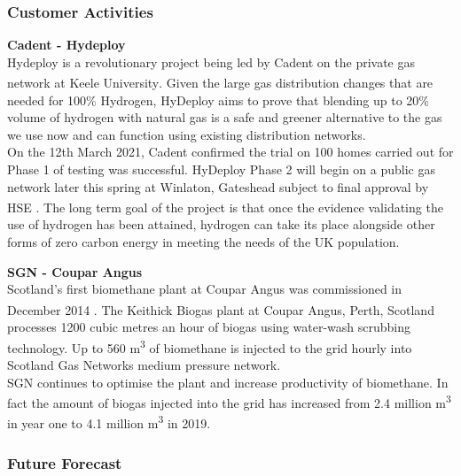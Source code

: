 \documentclass[11pt]{article}		%
\newcommand{\supercite}[1]{\textsuperscript{\cite{#1}}}		%
\begin{document}
    		\subsubsection{Customer Activities}%
    		
    		\textbf{Cadent - Hydeploy}
    		\\
            Hydeploy is a revolutionary project being led by Cadent on the private gas network at Keele University\supercite{whatishydeploy}. Given the large gas distribution changes that are needed for 100\% Hydrogen, HyDeploy aims to prove that blending up to 20\% volume of hydrogen with natural gas is a safe and greener alternative to the gas we use now and can function using existing distribution networks.
            \\
            \hspace*{3ex}On the 12th March 2021, Cadent confirmed the trial on 100 homes carried out for Phase 1 of testing was successful. HyDeploy Phase 2 will begin on a public gas network later this spring at Winlaton, Gateshead subject to final approval by HSE \supercite{hydeploy}. The long term goal of the project is that once the evidence validating the use of hydrogen has been attained, hydrogen can take its place alongside other forms of zero carbon energy in meeting the needs of the UK population.
    
    		\textbf{SGN - Coupar Angus}
    		\\
            Scotland’s first biomethane plant at Coupar Angus was commissioned in December 2014 \supercite{coupar}. The Keithick Biogas plant at Coupar Angus, Perth, Scotland processes 1200 cubic metres an hour of biogas using water-wash scrubbing technology. Up to 560 m\textsuperscript{3}  of biomethane is injected to the grid hourly into Scotland Gas Networks medium pressure network.
            \\
    	    \hspace*{3ex}SGN continues to optimise the plant and increase productivity of biomethane. In fact the amount of biogas injected into the grid has increased from 2.4 million m\textsuperscript{3} in year one to 4.1 million m\textsuperscript{3} in 2019\supercite{CAperforamnce}.
    
    		\subsubsection[Future Forecast]{Future Forecast} \label{futureForecast}
    		
\end{document}
